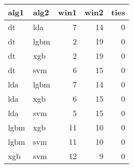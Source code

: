 \begin{tabular}{llrrr}
  \toprule
{\bfseries alg1} & {\bfseries alg2} & {\bfseries win1} & {\bfseries win2} & {\bfseries ties} \\ 
  \midrule
dt & lda & 7 & 14 & 0 \\ 
  dt & lgbm & 2 & 19 & 0 \\ 
  dt & xgb & 2 & 19 & 0 \\ 
  dt & svm & 6 & 15 & 0 \\ 
  lda & lgbm & 7 & 14 & 0 \\ 
  lda & xgb & 6 & 15 & 0 \\ 
  lda & svm & 5 & 15 & 0 \\ 
  lgbm & xgb & 11 & 10 & 0 \\ 
  lgbm & svm & 11 & 10 & 0 \\ 
  xgb & svm & 12 & 9 & 0 \\ 
   \bottomrule
\end{tabular}
